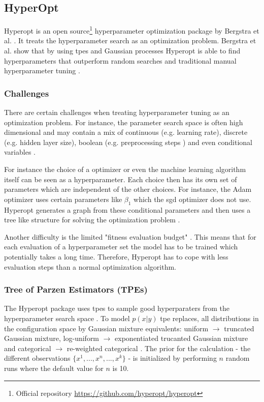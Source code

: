 \subsection{HyperOpt}

Hyperopt is an open source\footnote{Official repository \url{https://github.com/hyperopt/hyperopt}} hyperparameter optimization package by Bergstra et al. \cite{Bergstra2013a}. It treats the hyperparameter search as an optimization problem. Bergstra et al. show that by using \glspl{tpe} and Gaussian processes Hyperopt is able to find hyperparameters that outperform random searches and traditional manual hyperparameter tuning \cite{Bergstra2011}.




\subsubsection*{Challenges}

There are certain challenges when treating hyperparameter tuning as an optimization problem. For instance, the parameter search space is often high dimensional and may contain a mix of continuous {(e.g. learning rate)}, discrete {(e.g. hidden layer size)}, boolean {(e.g. preprocessing steps \cite{Hutter2009})} and even conditional variables \cite{Bergstra2013}. 

For instance the choice of a optimizer or even the machine learning algorithm itself can be seen as a hyperparameter. Each choice then has its own set of parameters which are independent of the other choices. For instance, the Adam optimizer uses certain parameters like $\beta_1$ which the \gls{sgd} optimizer does not use. Hyperopt generates a graph from these conditional parameters and then uses a tree like structure for solving the optimization problem \cite{Bergstra2011}.
\newline

Another difficulty is the limited "fitness evaluation budget" \cite{Bergstra2011}. This means that for each evaluation of a hyperparameter set the model has to be trained which potentially takes a long time. Therefore, Hyperopt has to cope with less evaluation steps than a normal optimization algorithm.

\subsubsection*{Tree of Parzen Estimators {(TPEs)}}
The Hyperopt package uses \glspl{tpe} to sample good hyperparaters from the hyperparameter search space \cite{Bergstra2013a}. To model $p(x|y)$ \gls{tpe} replaces, all distributions in the configuration space by Gaussian mixture equivalents: uniform $\rightarrow$ truncated Gaussian mixture, log-uniform $\rightarrow$ exponentiated trucanted Gaussian mixture and categorical $\rightarrow$ re-weighted categorical \cite{Bergstra2013a}. The prior for the calculation - the different observations $\{x^1,..., x^n, ..., x^k\}$ - is initialized by performing $n$ random runs where the default value for $n$ is 10.

